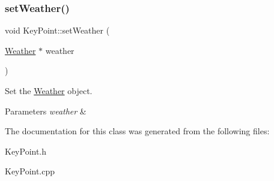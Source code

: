 \subsubsection{\texorpdfstring{set\+Weather()}{setWeather()}}
{\footnotesize\ttfamily void Key\+Point\+::set\+Weather (\begin{DoxyParamCaption}\item[{\hyperlink{classWeather}{Weather} $\ast$}]{weather }\end{DoxyParamCaption})}



Set the \hyperlink{classWeather}{Weather} object. 


\begin{DoxyParams}{Parameters}
{\em weather} & \\
\hline
\end{DoxyParams}


The documentation for this class was generated from the following files\+:\begin{DoxyCompactItemize}
\item 
Key\+Point.\+h\item 
Key\+Point.\+cpp\end{DoxyCompactItemize}
